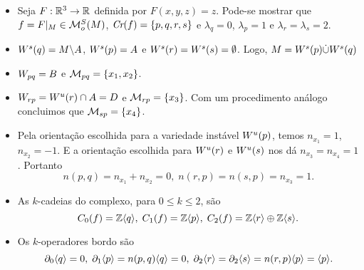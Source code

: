 \documentclass{beamer}
\begin{document}
	\begin{frame}
		\begin{itemize}
				\item Seja $F:\mathbb{R}^{3} \to \mathbb{R}^{}$ definida por $F(x, y, z) = z$. Pode-se mostrar que $f=F|_{M} \in \mathcal{M}^{S}_{o}(M)$,  $\textit{Cr}(f) = \{p,q,r,s\}$ e $\lambda_{q} = 0$, $\lambda_{p} = 1$ e $\lambda_{r}=\lambda_{s} = 2$. 
				
				\item $W^{s}(q) = M \backslash A$, $W^{s}(p) = A$ e $W^{s}(r) = W^{s}(s) = \emptyset$. Logo, $M = W^{s}(p)\dot{\cup} W^{s}(q)$
				
				\item $W_{pq} = B$ e $\mathcal{M}_{pq}=\{x_{1}, x_{2}\}$. 
				
				\item $W_{rp} = W^{u}(r) \cap A = D$ e $\mathcal{M}_{rp} = \{ x_{3}\}$. Com um procedimento análogo concluimos que $\mathcal{M}_{sp} = \{x_{4} \}$.
				
				\item Pela orientação escolhida para a variedade instável $W^{u}(p)$, temos $n_{x_{1}}=1$, $n_{x_{2}} = -1$. E a orientação escolhida para $W^{u}(r)$ e $W^{u}(s)$ nos dá $n_{x_{3}} =n_{x_{4}}= 1$. Portanto 
				$$
				n(p,q) = n_{x_{1}}+n_{x_{2}} = 0,\; n(r,p) = n(s,p)=n_{x_{3}}= 1. 
				$$			
		\end{itemize}
	\end{frame}
	
	\begin{frame}
		\begin{itemize}
		\item As $k$-cadeias do complexo, para $0\leq k\leq 2$, são
		$$
		C_{0}(f) = \mathbb{Z}\langle q\rangle,\; C_{1}(f) = \mathbb{Z}\langle p\rangle,\; C_{2}(f) = \mathbb{Z}\langle r\rangle\oplus\mathbb{Z}\langle s\rangle.
		$$
		
		\item Os $k$-operadores bordo são
		$$
		\partial_{0}\langle q\rangle =0,\; \partial_{1}\langle p\rangle=n(p,q)\langle q\rangle = 0,\; \partial_{2}\langle r\rangle=\partial_{2}\langle s\rangle = n(r,p)\langle p\rangle = \langle p\rangle.
		$$
		
		\end{itemize}
	\end{frame}
	
\end{document}
